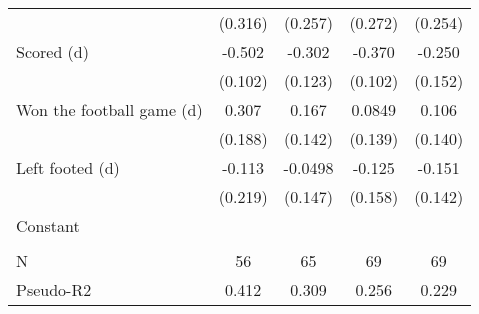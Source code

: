 {\begin{tabular}{l*{4}{c}}
                    &     (0.316)         &     (0.257)         &     (0.272)         &     (0.254)         \\
[1em]
Scored (d)          &      -0.502\sym{***}&      -0.302\sym{**} &      -0.370\sym{***}&      -0.250         \\
                    &     (0.102)         &     (0.123)         &     (0.102)         &     (0.152)         \\
[1em]
Won the football game (d)&       0.307         &       0.167         &      0.0849         &       0.106         \\
                    &     (0.188)         &     (0.142)         &     (0.139)         &     (0.140)         \\
[1em]
Left footed (d)     &      -0.113         &     -0.0498         &      -0.125         &      -0.151         \\
                    &     (0.219)         &     (0.147)         &     (0.158)         &     (0.142)         \\
[1em]
Constant            &                     &                     &                     &                     \\
                    &                     &                     &                     &                     \\
\hline
N                   &          56         &          65         &          69         &          69         \\
Pseudo-R2                  &       0.412         &       0.309         &       0.256         &       0.229         \\
\hline\hline
\end{tabular}
}
